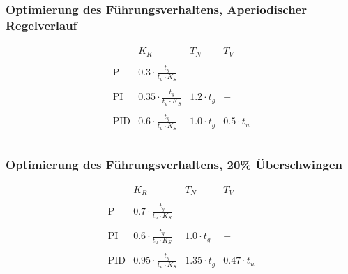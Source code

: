 \subsubsection{Optimierung des Führungsverhaltens, Aperiodischer Regelverlauf}
\[
    \begin{array}{lccc}
        &
            K_R &
            T_N &
            T_V \\\\
        \text{P} &
            0.3 \cdot \frac{t_g}{t_u \cdot K_S} &
            - &
            - \\\\
        \text{PI} &
            0.35 \cdot \frac{t_g}{t_u \cdot K_S} &
            1.2 \cdot t_g &
            - \\\\
        \text{PID} &
            0.6 \cdot \frac{t_g}{t_u \cdot K_S} &
            1.0 \cdot t_g &
            0.5 \cdot t_u \\\\
    \end{array}
\]

\subsubsection{Optimierung des Führungsverhaltens, 20\% Überschwingen}
\[
    \begin{array}{lccc}
        &
            K_R &
            T_N &
            T_V \\\\
        \text{P} &
            0.7 \cdot \frac{t_g}{t_u \cdot K_S} &
            - &
            - \\\\
        \text{PI} &
            0.6 \cdot \frac{t_g}{t_u \cdot K_S} &
            1.0 \cdot t_g &
            - \\\\
        \text{PID} &
            0.95 \cdot \frac{t_g}{t_u \cdot K_S} &
            1.35 \cdot t_g &
            0.47 \cdot t_u \\\\
    \end{array}
\]

